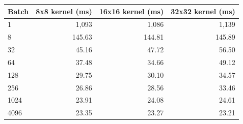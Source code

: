 \begin{tabular}{lrrr}
\toprule
Batch & 8x8 kernel (ms) & 16x16 kernel (ms) & 32x32 kernel (ms) \\
\midrule
1 & 1,093 & 1,086 & 1,139 \\
8 & 145.63 & 144.81 & 145.89 \\
32 & 45.16 & 47.72 & 56.50 \\
64 & 37.48 & 34.66 & 49.12 \\
128 & 29.75 & 30.10 & 34.57 \\
256 & 26.86 & 28.56 & 33.46 \\
1024 & 23.91 & 24.08 & 24.61 \\
4096 & 23.35 & 23.27 & 23.21 \\
\bottomrule
\end{tabular}
